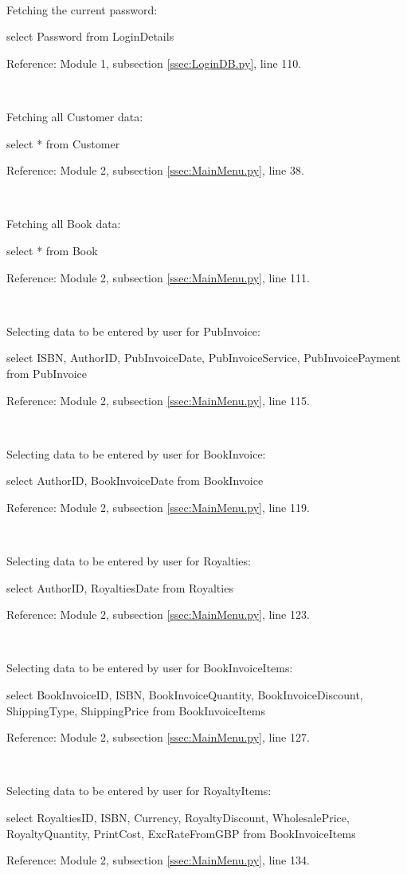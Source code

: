 \

Fetching the current password:
\begin{sql}
select Password
from LoginDetails
\end{sql}
Reference: Module 1,  subsection \ref{ssec:LoginDB.py}, line 110.

\

Fetching all Customer data:
\begin{sql}
select *
from Customer
\end{sql}
Reference: Module 2,  subsection \ref{ssec:MainMenu.py}, line 38.

\

Fetching all Book data:
\begin{sql}
select *
from Book
\end{sql}
Reference: Module 2,  subsection \ref{ssec:MainMenu.py}, line 111.

\

Selecting data to be entered by user for PubInvoice:
\begin{sql}
select ISBN, AuthorID, PubInvoiceDate, PubInvoiceService, PubInvoicePayment
from PubInvoice
\end{sql}
Reference: Module 2,  subsection \ref{ssec:MainMenu.py}, line 115.

\

Selecting data to be entered by user for BookInvoice:
\begin{sql}
select AuthorID, BookInvoiceDate
from BookInvoice
\end{sql}
Reference: Module 2,  subsection \ref{ssec:MainMenu.py}, line 119.

\

Selecting data to be entered by user for Royalties:
\begin{sql}
select AuthorID, RoyaltiesDate
from Royalties
\end{sql}
Reference: Module 2,  subsection \ref{ssec:MainMenu.py}, line 123.

\

Selecting data to be entered by user for BookInvoiceItems:
\begin{sql}
select BookInvoiceID, ISBN, BookInvoiceQuantity, BookInvoiceDiscount, ShippingType, ShippingPrice
from BookInvoiceItems
\end{sql}
Reference: Module 2,  subsection \ref{ssec:MainMenu.py}, line 127.

\

Selecting data to be entered by user for RoyaltyItems:
\begin{sql}
select RoyaltiesID, ISBN, Currency, RoyaltyDiscount, WholesalePrice, RoyaltyQuantity, PrintCost, ExcRateFromGBP
from BookInvoiceItems
\end{sql}
Reference: Module 2,  subsection \ref{ssec:MainMenu.py}, line 134.

